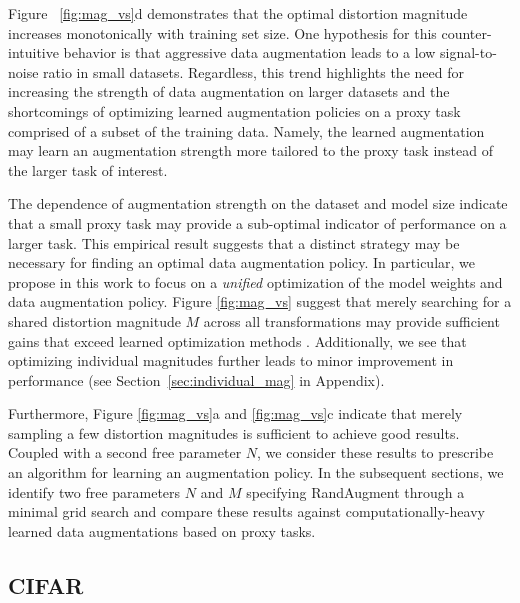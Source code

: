 Figure ~\ref{fig:mag_vs}d demonstrates that the optimal distortion magnitude increases monotonically with training set size.
One hypothesis for this counter-intuitive behavior is that aggressive data augmentation leads to a low signal-to-noise ratio in small datasets. Regardless, this trend highlights the need for increasing the strength of data augmentation on larger datasets and the shortcomings of optimizing learned augmentation policies on a proxy task comprised of a subset of the training data. Namely, the learned augmentation may learn an augmentation strength more tailored to the proxy task instead of the larger task of interest.

The dependence of augmentation strength on the dataset and model size indicate that a small proxy task may provide a sub-optimal indicator of performance on a larger task. This empirical result suggests that a distinct strategy may be necessary for finding an optimal data augmentation policy. In particular, we propose in this work to focus on a {\em unified} optimization of the model weights and data augmentation policy. Figure \ref{fig:mag_vs} suggest that merely searching for a shared distortion magnitude $M$ across all transformations may provide sufficient gains that exceed learned optimization methods \cite{cubuk2018autoaugment}. Additionally, we see that optimizing individual magnitudes further leads to minor improvement in performance (see Section~\ref{sec:individual_mag} in Appendix). 

Furthermore, Figure \ref{fig:mag_vs}a and \ref{fig:mag_vs}c indicate that merely sampling a few distortion magnitudes is sufficient to achieve good results. Coupled with a second free parameter $N$, we consider these results to prescribe an algorithm for learning an augmentation policy. In the subsequent sections, we identify two free parameters $N$ and $M$ specifying RandAugment through a minimal grid search and compare these results against computationally-heavy learned data augmentations based on proxy tasks.

\subsection{CIFAR}

